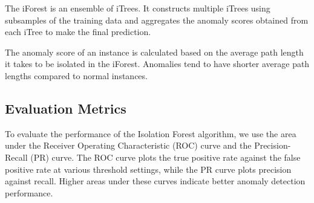 The iForest is an ensemble of iTrees. It constructs multiple iTrees using subsamples of the training data and aggregates the anomaly scores obtained from each iTree to make the final prediction.

The anomaly score of an instance is calculated based on the average path length it takes to be isolated in the iForest. Anomalies tend to have shorter average path lengths compared to normal instances.

\subsection{Evaluation Metrics}
To evaluate the performance of the Isolation Forest algorithm, we use the area under the Receiver Operating Characteristic (ROC) curve and the Precision-Recall (PR) curve. The ROC curve plots the true positive rate against the false positive rate at various threshold settings, while the PR curve plots precision against recall. Higher areas under these curves indicate better anomaly detection performance.
